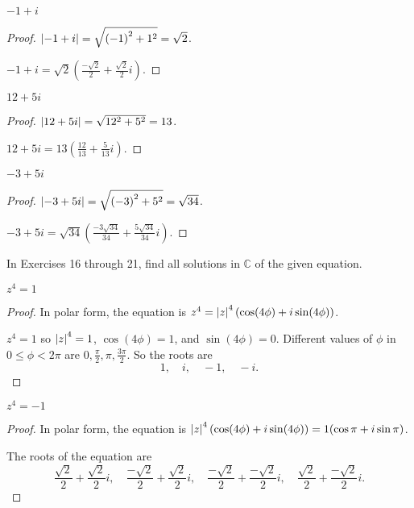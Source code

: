 \begin{exercise}
    $-1 + i$
\end{exercise}

\begin{proof}
    $\left\vert{-1 + i}\right\vert = \sqrt{{(-1)}^{2} + 1^{2}} = \sqrt{2}$.

    $-1 + i = \sqrt{2}\left(\frac{-\sqrt{2}}{2} + \frac{\sqrt{2}}{2}i\right)$.
\end{proof}

\begin{exercise}
    $12 + 5i$
\end{exercise}

\begin{proof}
    $\left\vert{12 + 5i}\right\vert = \sqrt{12^{2} + 5^{2}} = 13$.

    $12 + 5i = 13\left( \frac{12}{13} + \frac{5}{13}i \right)$.
\end{proof}

\begin{exercise}
    $-3 + 5i$
\end{exercise}

\begin{proof}
    $\left\vert{-3 + 5i}\right\vert = \sqrt{{(-3)}^{2} + 5^{2}} = \sqrt{34}$.

    $-3 + 5i = \sqrt{34}\left( \frac{-3\sqrt{34}}{34} + \frac{5\sqrt{34}}{34}i \right)$.
\end{proof}

In Exercises 16 through 21, find all solutions in $\mathbb{C}$ of the given equation.

\begin{exercise}
    $z^{4} = 1$
\end{exercise}

\begin{proof}
    In polar form, the equation is $z^{4} = \left\vert{z}\right\vert^{4}(\cos (4\phi) + i\sin (4\phi))$.

    $z^{4} = 1$ so $\left\vert{z}\right\vert^{4} = 1$, $\cos(4\phi) = 1$, and $\sin(4\phi) = 0$. Different values of $\phi$ in $0\le \phi < 2\pi$ are $0, \frac{\pi}{2}, \pi, \frac{3\pi}{2}$. So the roots are
    \[
        1,\quad i,\quad -1,\quad -i.
    \]
\end{proof}

\begin{exercise}
    $z^{4} = -1$
\end{exercise}

\begin{proof}
    In polar form, the equation is $\left\vert{z}\right\vert^{4}(\cos (4\phi) + i\sin (4\phi)) = 1(\cos\pi + i\sin\pi)$.

    The roots of the equation are
    \[
        \frac{\sqrt{2}}{2} + \frac{\sqrt{2}}{2}i,\quad \frac{-\sqrt{2}}{2} + \frac{\sqrt{2}}{2}i,\quad \frac{-\sqrt{2}}{2} + \frac{-\sqrt{2}}{2}i,\quad \frac{\sqrt{2}}{2} + \frac{-\sqrt{2}}{2}i.
    \]
\end{proof}

